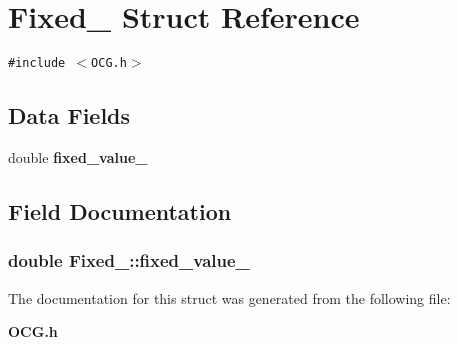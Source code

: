 \section{Fixed\_\- Struct Reference}
\label{structFixed__}
{\tt \#include $<$OCG.h$>$}

\subsection*{Data Fields}
\begin{CompactItemize}
\item 
double {\bf fixed\_\-value\_\-}
\end{CompactItemize}


\subsection{Field Documentation}
\subsubsection[{fixed\_\-value\_\-}]{\setlength{\rightskip}{0pt plus 5cm}double {\bf Fixed\_\-::fixed\_\-value\_\-}}\label{structFixed___b825cd9e0709fdc4e6b901c1ec9c18d1}




The documentation for this struct was generated from the following file:\begin{CompactItemize}
\item 
{\bf OCG.h}\end{CompactItemize}
